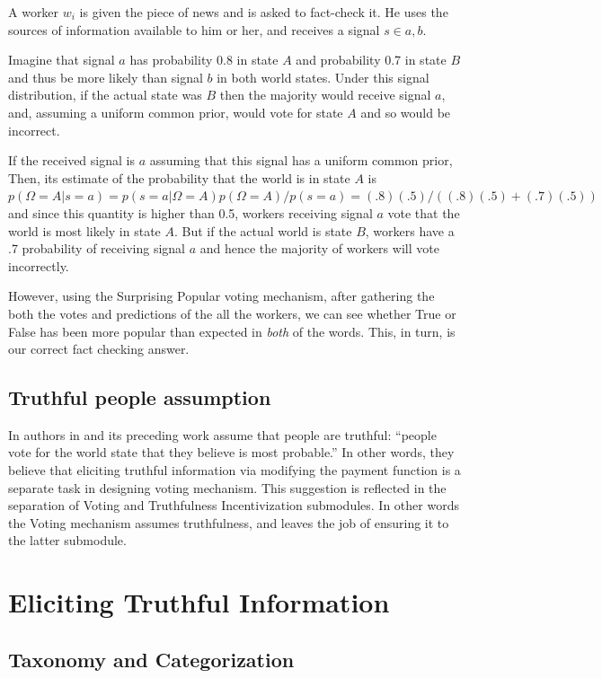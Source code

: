 \documentclass{report}
\theoremstyle{definition}
\begin{document}
A worker $w_i$ is given the piece of news and is asked to fact-check it. He uses the sources of information available to him or her, and receives a signal $s \in {a, b}$. 

Imagine that signal $a$ has probability 0.8
in state $A$ and probability 0.7 in state $B$ and thus be more likely
than signal $b$ in both world states. Under this signal distribution,
if the actual state was $B$ then the majority would receive signal
$a$, and, assuming a uniform common prior, would vote for state $A$
and so would be incorrect.

If the received signal is $a$ assuming that this signal has a uniform common prior, Then, its estimate of the
probability that the world is in state $A$ is $p(\Omega=A|s=a)=p(s=a|\Omega=A)p(\Omega=A)/p(s=a)=(.8)(.5)/((.8)(.5)+(.7)(.5))$
and since this quantity is higher than 0.5, workers receiving
signal $a$ vote that the world is most likely in state $A$. But
if the actual world is state $B$, workers have a .7 probability
of receiving signal $a$ and hence the majority of workers will
vote incorrectly.\cite{mccoy:stat}

However, using the Surprising Popular voting mechanism, after gathering the both the votes and predictions of the all the workers, we can see whether True or False has been more popular than expected in \emph{both} of the words. This, in turn, is our correct fact checking answer.

\section{Truthful people assumption}
In authors in \cite{mccoy:stat} and its preceding work \cite{prelec:nature} assume that people are truthful: ``people vote for the world state that they believe is most probable.'' In other words, they believe that eliciting truthful information via modifying the payment function is a separate task in designing voting mechanism. This suggestion is reflected in the separation of Voting and Truthfulness Incentivization submodules. In other words the Voting mechanism assumes truthfulness, and leaves the job of ensuring it to the latter submodule.



\chapter{Eliciting Truthful Information}
\section{Taxonomy and Categorization}
\end{document}
